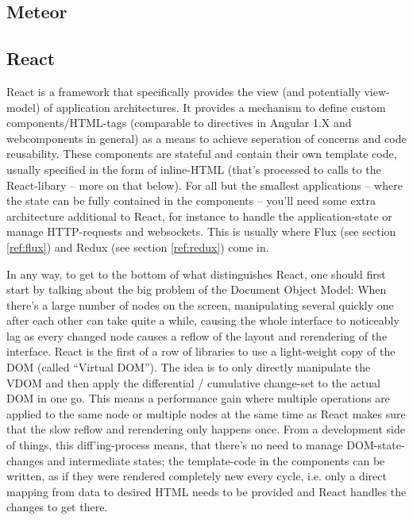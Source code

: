 \subsection{Meteor}


\subsection{React}

React is a framework that specifically provides the view (and potentially view-model) of application architectures. It provides a mechanism to define custom components/HTML-tags (comparable to directives in Angular 1.X and webcomponents in general) as a means to achieve seperation of concerns and code reusability. These components are stateful and contain their own template code, usually specified in the form of inline-HTML (that's processed to calls to the React-libary -- more on that
below). %
For all but the smallest applications -- where the state can be fully contained in the components -- you'll need some extra architecture additional to React, for instance to handle the application-state or manage HTTP-requests and websockets. This is usually where Flux (see section \ref{ref:flux}) and Redux (see section \ref{ref:redux}) come in.

In any way, to get to the bottom of what distinguishes React, one should first start by talking about the big problem of the Document Object Model: When there's a large number of nodes on the screen, manipulating several quickly one after each other can take quite a while, causing the whole interface to noticeably lag as every changed node causes a reflow of the layout and rerendering of the interface. React is the first of a row of libraries to use a light-weight copy of the DOM (called ``Virtual DOM''). The idea is to only directly manipulate the VDOM and then apply
the differential / cumulative change-set to the actual DOM in one go. This means a performance gain where multiple operations are applied to the same node or multiple nodes at the same time as React makes sure that the slow reflow and rerendering only happens once. From a development side of things, this diff'ing-process means, that there's no need to manage DOM-state-changes and intermediate states; the template-code in the components can be written, as if they were rendered completely new every cycle, i.e. only a direct
mapping from data to desired HTML needs to be provided and React handles the changes to get there.

